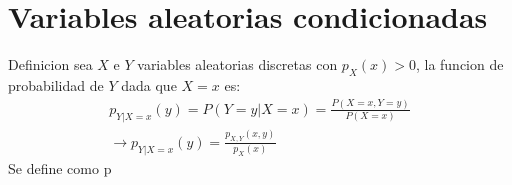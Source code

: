 \documentclass[titlepage,a4paper]{article}
\begin{document}
\section{Variables aleatorias condicionadas}
Definicion sea $X$ e $Y$ variables aleatorias discretas con $p_{X}(x)>0$, la funcion 
de probabilidad de $Y$ dada que $X=x$ es:
\begin{eqnarray*}
    p_{Y|X=x}(y) = P(Y=y|X=x) = \frac{P(X=x,Y=y)}{P(X=x)} \\
    \rightarrow p_{Y|X=x}(y)=\frac{p_{X,Y}(x,y)}{p_{X}(x)}
\end{eqnarray*}
Se define como p
     
\end{document}
